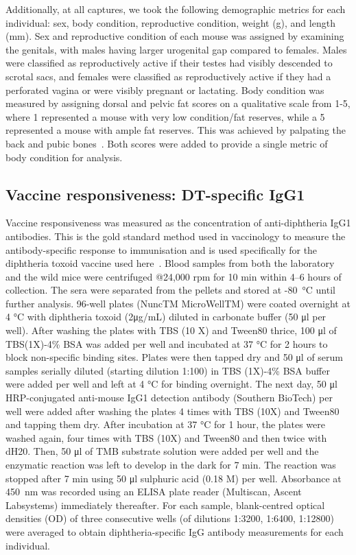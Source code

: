 \documentclass[a4paper, hidelinks, 11pt]{article}
\begin{document}
Additionally, at all captures, we took the following demographic metrics for each individual: sex, body condition, reproductive condition, weight (g), and length (mm). Sex and reproductive condition of each mouse was assigned by examining the genitals, with males having larger urogenital gap compared to females. Males were classified as reproductively active if their testes had visibly descended to scrotal sacs, and females were classified as reproductively active if they had a perforated vagina or were visibly pregnant or lactating. Body condition was measured by assigning dorsal and pelvic fat scores on a qualitative scale from 1-5, where 1 represented a mouse with very low condition/fat reserves, while a 5 represented a mouse with ample fat reserves. This was achieved by palpating the back and pubic bones~\cite{Ullman-Cullere1999}. Both scores were added to provide a single metric of body condition for analysis.

\subsection{Vaccine responsiveness: DT-specific IgG1}

Vaccine responsiveness was measured as the concentration of anti-diphtheria IgG1 antibodies. This is the gold standard method used in vaccinology to measure the antibody-specific response to immunisation and is used specifically for the diphtheria toxoid vaccine used here~\cite{Faruq2010}. Blood samples from both the laboratory and the wild mice were centrifuged @24,000 rpm for 10 min within 4–6 hours of collection. The sera were separated from the pellets and stored at -80 °C until further analysis. 96-well plates (NuncTM MicroWellTM) were coated overnight at 4 °C with diphtheria toxoid (2μg/mL) diluted in carbonate buffer (50 μl per well). After washing the plates with TBS (10 X) and Tween80 thrice, 100 μl of TBS(1X)-4\% BSA was added per well and incubated at 37 °C for 2 hours to block non-specific binding sites. Plates were then tapped dry and 50 μl of serum samples serially diluted (starting dilution 1:100) in TBS (1X)-4\% BSA buffer were added per well and left at 4 °C for binding overnight. The next day, 50 μl HRP-conjugated anti-mouse IgG1 detection antibody (Southern BioTech) per well were added after washing the plates 4 times with TBS (10X) and Tween80 and tapping them dry. After incubation at 37 °C for 1 hour, the plates were washed again, four times with TBS (10X) and Tween80 and then twice with dH20. Then, 50 μl of TMB substrate solution were added per well and the enzymatic reaction was left to develop in the dark for 7 min. The reaction was stopped after 7 min using 50 μl sulphuric acid (0.18 M) per well. Absorbance at 450 nm was recorded using an ELISA plate reader (Multiscan, Ascent Labsystems) immediately thereafter. For each sample, blank-centred optical densities (OD) of three consecutive wells (of dilutions 1:3200, 1:6400, 1:12800) were averaged to obtain diphtheria-specific IgG antibody measurements for each individual.
\end{document}
